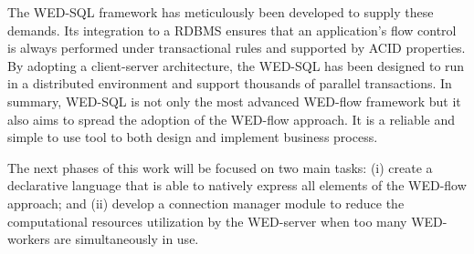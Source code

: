 \documentclass[12pt]{article}
\begin{document}
The WED-SQL framework has meticulously been developed  to supply these demands. Its integration to a RDBMS ensures that an application's flow  control is always performed under transactional rules and supported  by ACID properties. By adopting a client-server architecture, the WED-SQL   has been designed to run in a distributed environment and support thousands of parallel transactions. In summary, WED-SQL is not only the most advanced WED-flow framework but it also aims to spread the adoption of the WED-flow approach. It is a reliable and simple to use tool to both design and implement business process.

The next phases of this work will be focused on two main tasks: (i) create a declarative language that is able to natively express all elements of the WED-flow approach; and (ii) develop a connection manager module to reduce the computational resources utilization by the WED-server when too many WED-workers are simultaneously in use.




\end{document}
